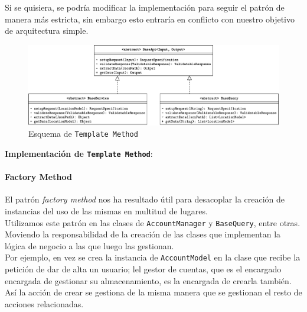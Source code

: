 \documentclass[../ei103948-project-documentation.tex]{subfiles}
\begin{document}
                        Si se quisiera, se podría modificar la implementación para seguir el patrón de manera más estricta, sin embargo esto entraría en conflicto con nuestro objetivo de arquitectura simple.
            
                        \begin{figure}[H]
                            \begin{center}
                            \includegraphics[scale=0.135]{images/TemplateMethod.png}
                            \end{center}
                            \caption{Esquema de \texttt{Template Method}}
                        \end{figure}
            
                        \newpage
                        \textbf{Implementación de \texttt{Template Method}}:
                        
            
            
            
                        \paragraph{Factory Method}
                        El patrón \textit{factory method} nos ha resultado útil para desacoplar la creación de instancias del uso de las mismas en multitud de lugares.\\
            
                        Utilizamos este patrón en las clases de \texttt{AccountManager} y \texttt{BaseQuery}, entre otras. Moviendo la responsabilidad de la creación de las clases que implementan la lógica de negocio a las que luego las gestionan.\\
            
                        Por ejemplo, en vez se crea la instancia de \texttt{AccountModel} en la clase que recibe la petición de dar de alta un usuario; lel gestor de cuentas, que es el encargado encargada de gestionar su almacenamiento, es la encargada de crearla también. Así la acción de crear se gestiona de la misma manera que se gestionan el resto de acciones relacionadas.
            
\end{document}

